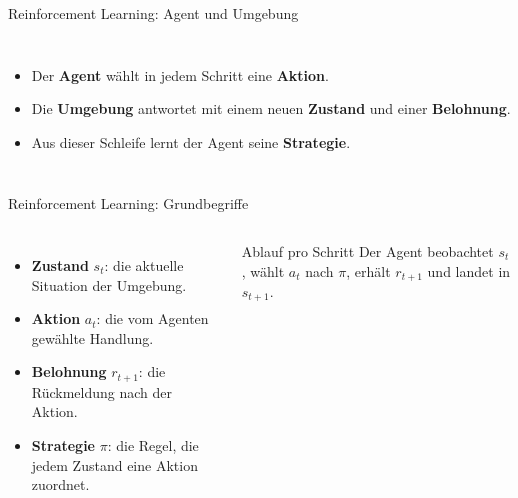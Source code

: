 \begin{frame}{Reinforcement Learning: Agent und Umgebung}
\begin{columns}
\begin{itemize}
  \item Der \textbf{Agent} wählt in jedem Schritt eine \textbf{Aktion}.
  \item Die \textbf{Umgebung} antwortet mit einem neuen \textbf{Zustand} und
        einer \textbf{Belohnung}.
  \item Aus dieser Schleife lernt der Agent seine \textbf{Strategie}.
\end{itemize}

\centering
{}
\end{columns}
\end{frame}

\begin{frame}{Reinforcement Learning: Grundbegriffe}
\begin{columns}
\begin{itemize}
  \item \textbf{Zustand} $s_t$: die aktuelle Situation der Umgebung.
  \item \textbf{Aktion} $a_t$: die vom Agenten gewählte Handlung.
  \item \textbf{Belohnung} $r_{t+1}$: die Rückmeldung nach der Aktion.
  \item \textbf{Strategie} $\pi$: die Regel, die jedem Zustand eine Aktion
        zuordnet.
\end{itemize}

\begin{block}{Ablauf pro Schritt}
Der Agent beobachtet $s_t$, wählt $a_t$ nach $\pi$, erhält $r_{t+1}$ und
landet in $s_{t+1}$.
\end{block}
\end{columns}
\end{frame}




